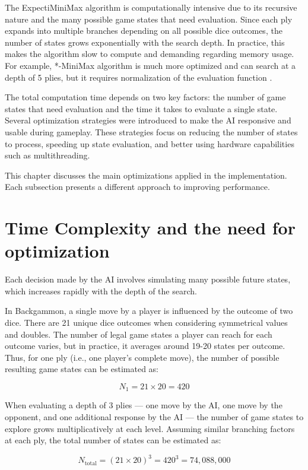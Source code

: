 The ExpectiMiniMax algorithm is computationally intensive due to its recursive nature and the many possible game states that need evaluation. Since each ply expands into multiple branches depending on all possible dice outcomes, the number of states grows exponentially with the search depth. In practice, this makes the algorithm slow to compute and demanding regarding memory usage. For example, *-MiniMax algorithm is much more optimized and can search at a depth of 5 plies, but it requires normalization of the evaluation function \cite{*-MiniMax}.

The total computation time depends on two key factors: the number of game states that need evaluation and the time it takes to evaluate a single state. Several optimization strategies were introduced to make the AI responsive and usable during gameplay. These strategies focus on reducing the number of states to process, speeding up state evaluation, and better using hardware capabilities such as multithreading.

This chapter discusses the main optimizations applied in the implementation. Each subsection presents a different approach to improving performance.

\section{Time Complexity and the need for optimization}

Each decision made by the AI involves simulating many possible future states, which increases rapidly with the depth of the search.

In Backgammon, a single move by a player is influenced by the outcome of two dice. There are 21 unique dice outcomes when considering symmetrical values and doubles. The number of legal game states a player can reach for each outcome varies, but in practice, it averages around 19-20 states per outcome. Thus, for one ply (i.e., one player's complete move), the number of possible resulting game states can be estimated as:

\[
N_1 = 21 \times 20 = 420
\]

When evaluating a depth of 3 plies — one move by the AI, one move by the opponent, and one additional response by the AI — the number of game states to explore grows multiplicatively at each level. Assuming similar branching factors at each ply, the total number of states can be estimated as:

\[
N_{\text{total}} = (21 \times 20)^3 = 420^3 = 74,\!088,\!000
\]

